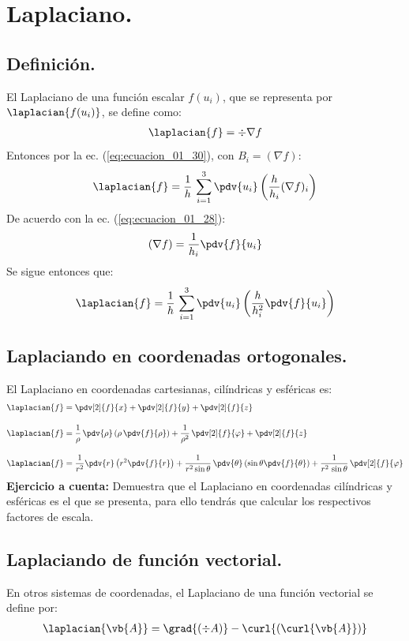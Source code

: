 \section{Laplaciano.}
\subsection{Definición.}
El Laplaciano de una función escalar $f(u_{i})$, que se representa por $\laplacian{f(u_{i})}$, se define como:
\begin{align*}
\laplacian{f} = \div{\nabla f}
\end{align*}
Entonces por la ec. (\ref{eq:ecuacion_01_30}), con $B_{i} = (\nabla f)$:
\begin{align*}
\laplacian{f} = \dfrac{1}{h} \, \sum_{i=1}^{3} \pdv{u_{i}} \left( \dfrac{h}{h_{i}}  (\nabla f)_{i} \right)
\end{align*}
De acuerdo con la ec. (\ref{eq:ecuacion_01_28}):
\begin{align*}
(\nabla f) = \dfrac{1}{h_{i}} \pdv{f}{u_{i}}
\end{align*}
Se sigue entonces que:
\begin{align}
\laplacian{f} = \dfrac{1}{h} \, \sum_{i=1}^{3} \pdv{u_{i}} \left( \dfrac{h}{h_{i}^{2}}  \pdv{f}{u_{i}} \right)
\label{eq:ecuacion_01_36}
\end{align}
\subsection{Laplaciando en coordenadas ortogonales.}
El Laplaciano en coordenadas cartesianas, cilíndricas y esféricas es:
\fontsize{12}{12}\selectfont
\begin{align*}
\laplacian{f} &= \pdv[2]{f}{x} + \pdv[2]{f}{y} + \pdv[2]{f}{z} \\[1em]
\laplacian{f} &= \dfrac{1}{\rho} \, \pdv{\rho} \left( \rho \, \pdv{f}{\rho} \right) + \dfrac{1}{\rho^{2}} \, \pdv[2]{f}{\varphi} + \pdv[2]{f}{z} \\[1em]
\laplacian{f} &= \dfrac{1}{r^{2}} \pdv{r} \left( r^{2} \pdv{f}{r} \right) + \dfrac{1}{r^{2} \sin \theta} \, \pdv{\theta} \left( \sin \theta \pdv{f}{\theta} \right) + \dfrac{1}{r^{2} \, \sin \theta} \, \pdv[2]{f}{\varphi}
\end{align*}
\textbf{Ejercicio a cuenta: } Demuestra que el Laplaciano en coordenadas cilíndricas y esféricas es el que se presenta, para ello tendrás que calcular los respectivos factores de escala.
\subsection*{Laplaciando de función vectorial.}
En otros sistemas de coordenadas, el Laplaciano de una función vectorial se define por:
\begin{align*}
\laplacian{\vb{A}} = \grad{(\div{A})} - \curl{(\curl{\vb{A}})}
\end{align*}
